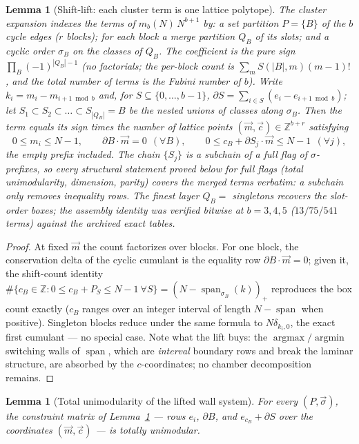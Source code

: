\documentclass[11pt]{article}
\numberwithin{equation}{section}
\newtheorem{lemma}[theorem]{Lemma}
\theoremstyle{definition}
\theoremstyle{remark}
\begin{document}
\begin{lemma}[Shift-lift: each cluster term is one lattice
polytope]\label{l:lift}
The cluster expansion indexes the terms of
$m_b(N)\,N^{b+1}$ by: a set partition $P=\{B\}$ of the $b$
cycle edges ($r$ blocks); for each block a \emph{merge
partition} $Q_B$ of its slots; and a cyclic order
$\sigma_B$ on the classes of $Q_B$. The coefficient is the
pure sign $\prod_B(-1)^{|Q_B|-1}$ (no factorials; the
per-block count is $\sum_m S(|B|,m)(m-1)!$, and the total
number of terms is the Fubini number of $b$). Write
$k_i=m_i-m_{i+1\bmod b}$ and, for $S\subseteq\{0,\dots,b-1\}$,
$\partial S=\sum_{i\in S}(e_i-e_{i+1\bmod b})$; let
$S_1\subset S_2\subset\dots\subset S_{|Q_B|}=B$ be the
nested unions of classes along $\sigma_B$. Then the term
equals its sign times the number of lattice points
$(\vec m,\vec c)\in\mathbb Z^{b+r}$ satisfying
\[
0\le m_i\le N-1,\qquad
\partial B\cdot\vec m=0\ \ (\forall B),\qquad
0\le c_B+\partial S_j\cdot\vec m\le N-1\ \ (\forall j),
\]
the empty prefix included. The chain
$\{S_j\}$ is a subchain of a full flag of $\sigma$-prefixes,
so every structural statement proved below for full flags
(total unimodularity, dimension, parity) covers the merged
terms verbatim: a subchain only removes inequality rows.
The finest layer $Q_B=$ singletons recovers the slot-order
boxes; the assembly identity was verified bitwise at
$b=3,4,5$ ($13/75/541$ terms) against the archived exact
tables.
\end{lemma}

\begin{proof}
At fixed $\vec m$ the count factorizes over blocks. For one
block, the conservation delta of the cyclic cumulant is the
equality row $\partial B\cdot\vec m=0$; given it, the
shift-count identity
$\#\{c_B\in\mathbb Z:0\le c_B+P_S\le N-1\ \forall S\}
=(N-\operatorname{span}_{\sigma_B}(k))_+$ reproduces the box
count exactly ($c_B$ ranges over an integer interval of
length $N-\operatorname{span}$ when positive). Singleton
blocks reduce under the same formula to $N\delta_{k_i,0}$,
the exact first cumulant --- no special case. Note what the
lift buys: the $\operatorname{argmax}/\operatorname{argmin}$
switching walls of $\operatorname{span}$, which are
\emph{interval} boundary rows and break the laminar
structure, are absorbed by the $c$-coordinates; no chamber
decomposition remains.
\end{proof}

\begin{lemma}[Total unimodularity of the lifted wall
system]\label{l:tu}
For every $(P,\vec\sigma)$, the constraint matrix of
Lemma~\ref{l:lift} --- rows $e_i$, $\partial B$, and
$e_{c_B}+\partial S$ over the coordinates $(\vec m,\vec c)$
--- is totally unimodular.
\end{lemma}
\end{document}
